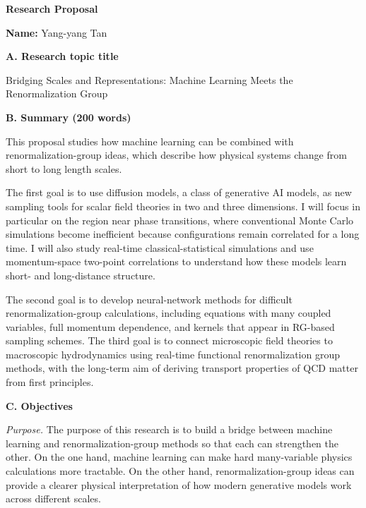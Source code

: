 \documentclass[11pt,a4paper]{article}
\begin{document}
\begin{center}
    \textbf{\Large Research Proposal}
\end{center}



\vspace{0.5cm}
\textbf{Name:} Yang-yang Tan

\vspace{0.5cm}
\textbf{A. Research topic title}

Bridging Scales and Representations: Machine Learning Meets the Renormalization Group

\vspace{0.5cm}
\textbf{B. Summary (200 words)}

This proposal studies how machine learning can be combined with renormalization-group ideas, which describe how physical systems change from short to long length scales.

The first goal is to use diffusion models, a class of generative AI models, as new sampling tools for scalar field theories in two and three dimensions. I will focus in particular on the region near phase transitions, where conventional Monte Carlo simulations become inefficient because configurations remain correlated for a long time. I will also study real-time classical-statistical simulations and use momentum-space two-point correlations to understand how these models learn short- and long-distance structure.

The second goal is to develop neural-network methods for difficult renormalization-group calculations, including equations with many coupled variables, full momentum dependence, and kernels that appear in RG-based sampling schemes. The third goal is to connect microscopic field theories to macroscopic hydrodynamics using real-time functional renormalization group methods, with the long-term aim of deriving transport properties of QCD matter from first principles.

\vspace{0.5cm}
\textbf{C. Objectives}

\textit{Purpose.}
The purpose of this research is to build a bridge between machine learning and renormalization-group methods so that each can strengthen the other. On the one hand, machine learning can make hard many-variable physics calculations more tractable. On the other hand, renormalization-group ideas can provide a clearer physical interpretation of how modern generative models work across different scales.
\end{document}
